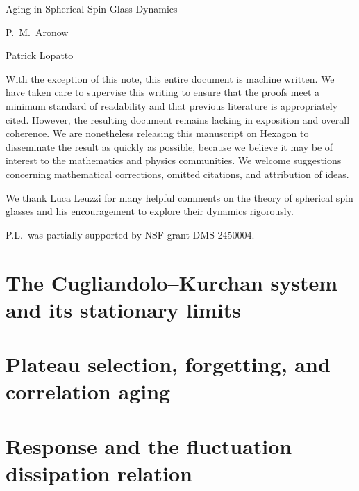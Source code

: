 \documentclass[12pt,oneside,openany]{book}
\numberwithin{equation}{chapter}
\theoremstyle{plain}
\theoremstyle{definition}
\theoremstyle{remark}
\newcommand{\npptitlepage}[2]{%
  \hypersetup{pageanchor=false}%
  \begin{titlepage}
  \centering\normalfont
  \vspace*{1.7in}
  {\large\strut\par}
  \vspace{1.05in}
  {\fontsize{28}{35}\selectfont #1\par}
  \vspace{1.1in}
  {\Large\def\\{\par\vspace{10pt}}#2\par}
  \vfill
  \end{titlepage}%
  \hypersetup{pageanchor=true}}
\newcommand{\1}{\mathbf 1}
\begin{document}
\frontmatter
\npptitlepage{Aging in Spherical Spin Glass Dynamics}{P.\ M.\ Aronow\\Patrick Lopatto}
\begin{authorsnote}
With the exception of this note, this entire document is machine written. We have taken care to supervise this writing to ensure that the proofs meet a minimum standard of readability and that previous literature is appropriately cited. However, the resulting document remains lacking in exposition and overall coherence. We are nonetheless releasing this manuscript on Hexagon to disseminate the result as quickly as possible, because we believe it may be of interest to the mathematics and physics communities. We welcome suggestions concerning mathematical corrections, omitted citations, and attribution of ideas.

We thank Luca Leuzzi for many helpful comments on the theory of spherical spin glasses and his encouragement to explore their dynamics rigorously.

P.L.\ was partially supported by NSF grant DMS-2450004.

\end{authorsnote}
\begin{abstractpage}

\end{abstractpage}
\tableofcontents
\mainmatter




\part{The Cugliandolo--Kurchan system and its stationary limits}\label{part:foundations}




\part{Plateau selection, forgetting, and correlation aging}\label{part:selection}






\part{Response and the fluctuation--dissipation relation}\label{part:response}


\end{document}
